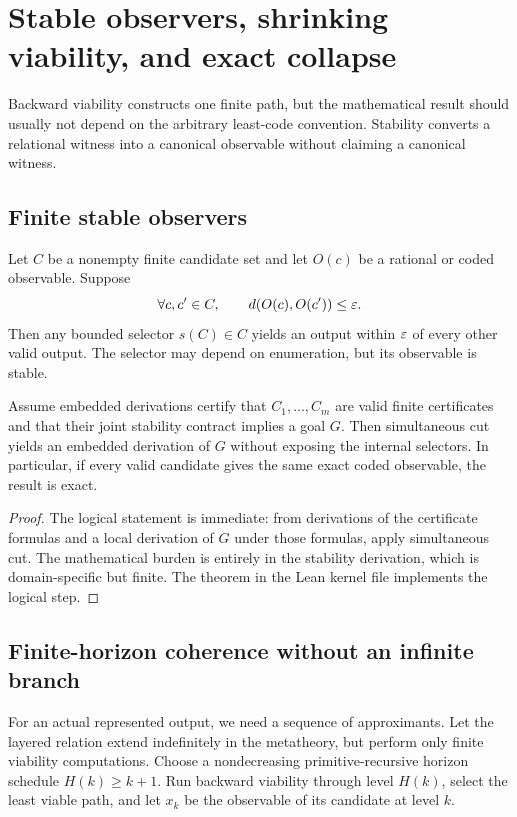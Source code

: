 \section{Stable observers, shrinking viability, and exact collapse}
\label{sec:stability}

Backward viability constructs one finite path, but the mathematical result should
usually not depend on the arbitrary least-code convention.  Stability converts a
relational witness into a canonical observable without claiming a canonical witness.

\subsection{Finite stable observers}

Let \(C\) be a nonempty finite candidate set and let \(O(c)\) be a rational or coded
observable.  Suppose
\[
   \forall c,c'\in C,
   \qquad d(O(c),O(c'))\le\varepsilon.
\]
Then any bounded selector \(s(C)\in C\) yields an output within \(\varepsilon\) of every other
valid output.  The selector may depend on enumeration, but its observable is stable.

\begin{theorem}
\label{thm:stable-observer}
Assume embedded derivations certify that \(C_1,\ldots,C_m\) are valid finite
certificates and that their joint stability contract implies a goal \(G\).  Then
simultaneous cut yields an embedded derivation of \(G\) without exposing the internal
selectors.  In particular, if every valid candidate gives the same exact coded
observable, the result is exact.
\end{theorem}

\begin{proof}
The logical statement is immediate: from derivations of the certificate formulas and a
local derivation of \(G\) under those formulas, apply simultaneous cut.  The
mathematical burden is entirely in the stability derivation, which is domain-specific
but finite.  The  theorem in the Lean kernel file implements the
logical step.
\end{proof}

\subsection{Finite-horizon coherence without an infinite branch}

For an actual represented output, we need a sequence of approximants.  Let the layered
relation extend indefinitely in the metatheory, but perform only finite viability
computations.  Choose a nondecreasing primitive-recursive horizon schedule
\(H(k)\ge k+1\).  Run backward viability through level \(H(k)\), select the least
viable path, and let \(x_k\) be the observable of its candidate at level \(k\).

